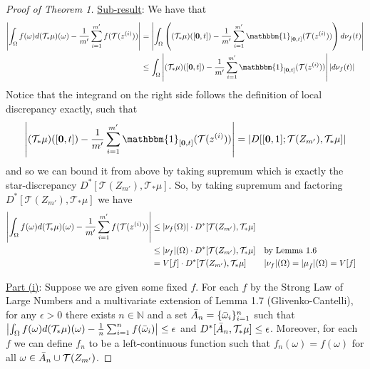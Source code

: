 \documentclass{article}
\begin{document}
\begin{proof}[Proof of Theorem 1]
    \underline{Sub-result}: We have that
    \begin{align*}
        \left| \int_{\Omega} f(\omega) d(\mathcal{T}_{*}\mu)(\omega) -  \frac{1}{m'} \sum_{i=1}^{m'} f(\mathcal{T}(z^{(i)})) \right| & = \left| \int_{\Omega} \left( (\mathcal{T}_{*}\mu)([\mathbf{0}, t]) -  \frac{1}{m'} \sum_{i=1}^{m'} \mathbbm{1}_{[\mathbf{0}, t]}(\mathcal{T}(z^{(i)})) \right) d\nu_f (t) \right| \\
        & \leq \int_{\Omega} \left| (\mathcal{T}_{*}\mu)([\mathbf{0}, t]) -  \frac{1}{m'} \sum_{i=1}^{m'} \mathbbm{1}_{[\mathbf{0}, t]}(\mathcal{T}(z^{(i)})) \right| \left|d\nu_f (t)\right|
    \end{align*}
    Notice that the integrand on the right side follows the definition of local discrepancy exactly, such that
    \[\left| (\mathcal{T}_{*}\mu)([\mathbf{0}, t]) -  \frac{1}{m'} \sum_{i=1}^{m'} \mathbbm{1}_{[\mathbf{0}, t]}(\mathcal{T}(z^{(i)})) \right| = \left| D[[\mathbf{0}, 1]; \mathcal{T}(Z_{m'}), \mathcal{T}_{*}\mu] \right|\]
    and so we can bound it from above by taking supremum which is exactly the star-discrepancy $D^*[\mathcal{T}(Z_{m'}), \mathcal{T}_{*}\mu]$. So, by taking supremum and factoring $D^*[\mathcal{T}(Z_{m'}), \mathcal{T}_{*}\mu]$ we have
    \begin{align*}
        \left| \int_{\Omega} f(\omega) d(\mathcal{T}_{*}\mu)(\omega) -  \frac{1}{m'} \sum_{i=1}^{m'} f(\mathcal{T}(z^{(i)})) \right| & \leq |\nu_f (\Omega)| \cdot D^*[\mathcal{T}(Z_{m'}), \mathcal{T}_{*}\mu] \\
        & \leq |\nu_f| (\Omega) \cdot D^*[\mathcal{T}(Z_{m'}), \mathcal{T}_{*}\mu] && \text{by Lemma 1.6} \\
        & = V[f] \cdot  D^*[\mathcal{T}(Z_{m'}), \mathcal{T}_{*}\mu] && |\nu_f| (\Omega) = |\mu_{\Tilde{f}}| (\Omega) = V[f]
    \end{align*}

    \underline{Part (i)}: Suppose we are given some fixed $f$. For each $f$ by the Strong Law of Large Numbers and a multivariate extension of Lemma 1.7 (Glivenko-Cantelli), for any $\epsilon > 0$ there exists $n \in \mathbb{N}$ and a set $\Bar{A}_n = \{ \Bar{\omega}_i \}_{i=1}^{n}$ such that
    $\left| \int_{\Omega} f(\omega) d(\mathcal{T}_{*}\mu)(\omega) - \frac{1}{n} \sum_{i=1}^{n} f(\Bar{\omega}_i) \right| \leq \epsilon$ and $D^*[\Bar{A}_n, \mathcal{T}_{*}\mu] \leq \epsilon$. Moreover, for each $f$ we can define $f_n$ to be a left-continuous function such that $f_n (\omega) = f(\omega)$ for all $\omega \in \Bar{A}_n \cup \mathcal{T}(Z_{m'})$.


\end{proof}
\end{document}
